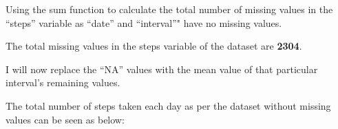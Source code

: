 \documentclass[]{article}
\newenvironment{Shaded}{\begin{snugshade}}{\end{snugshade}}
\newcommand{\KeywordTok}[1]{\textcolor[rgb]{0.13,0.29,0.53}{\textbf{#1}}}
\newcommand{\DataTypeTok}[1]{\textcolor[rgb]{0.13,0.29,0.53}{#1}}
\newcommand{\DecValTok}[1]{\textcolor[rgb]{0.00,0.00,0.81}{#1}}
\newcommand{\StringTok}[1]{\textcolor[rgb]{0.31,0.60,0.02}{#1}}
\newcommand{\OtherTok}[1]{\textcolor[rgb]{0.56,0.35,0.01}{#1}}
\newcommand{\ControlFlowTok}[1]{\textcolor[rgb]{0.13,0.29,0.53}{\textbf{#1}}}
\newcommand{\OperatorTok}[1]{\textcolor[rgb]{0.81,0.36,0.00}{\textbf{#1}}}
\newcommand{\NormalTok}[1]{#1}
\begin{document}
Using the sum function to calculate the total number of missing values
in the ``steps'' variable as ``date'' and ``interval''" have no missing
values.

\begin{Shaded}
\end{Shaded}

The total missing values in the steps variable of the dataset are
\textbf{2304}.

I will now replace the ``NA'' values with the mean value of that
particular interval's remaining values.

\begin{Shaded}
\end{Shaded}

The total number of steps taken each day as per the dataset without
missing values can be seen as below:

\begin{Shaded}
\end{Shaded}
\end{document}
